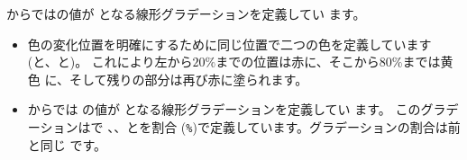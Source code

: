 からではの値が
となる線形グラデーションを定義してい
ます。
\begin{itemize}
 \item 色の変化位置を明確にするために同じ位置で二つの色を定義しています
       (と、と)。
 これにより左から$20\%$までの位置は赤に、そこから$80\%$までは黄色
       に、そして残りの部分は再び赤に塗られます。
\item {}からでは
の値が
となる線形グラデーションを定義してい
ます。
%
このグラデーションはで
、、とを割合
(\texttt{\%})で定義しています。グラデーションの割合は前と同じ
      です。


\end{itemize}
